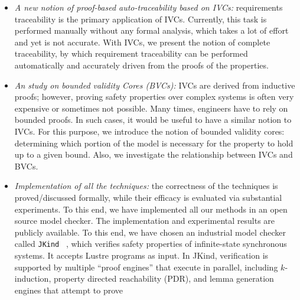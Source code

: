 \begin{itemize}
\item \emph{A new notion of proof-based auto-traceability based on IVCs:} requirements traceability is the primary application of IVCs. Currently, this task is performed manually without any formal analysis, which takes a lot of effort and yet is not accurate. With IVCs, we present the notion of complete traceability, by which requirement traceability can be performed automatically and accurately driven from the proofs of the properties.
     \item \emph{An study on bounded validity Cores (BVCs):} IVCs are derived from inductive proofs; however, proving safety properties over complex systems is often very expensive or sometimes not possible. Many times, engineers have to rely on bounded proofs. In such cases, it would be useful to have a similar notion to IVCs. For this purpose, we introduce the notion of bounded validity cores: determining which portion of the model is necessary for the property to hold up to a given bound. Also, we investigate the relationship between IVCs and BVCs.
\item \emph{Implementation of all the techniques:} the correctness of the techniques is proved/discussed formally, while their efficacy is evaluated via substantial experiments. To this end, we have implemented all our methods in an open source model checker. The implementation and experimental results are publicly available. To this  end, we have chosen an industrial model checker called \texttt{JKind} ~\cite{jkind},
which verifies safety properties of infinite-state synchronous systems.
It accepts Lustre programs \cite{Halbwachs91:lustre} as input. In JKind, verification is supported by multiple ``proof engines'' that execute in parallel, including $k$-induction,
property directed reachability (PDR), and lemma generation engines that attempt to prove

\end{itemize}
